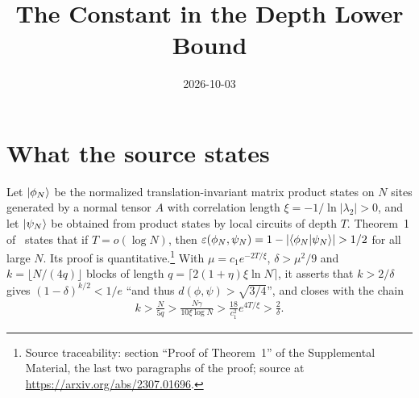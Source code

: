 \documentclass{article}
\title{The Constant in the Depth Lower Bound}
\author{}
\date{2026-10-03}
\begin{document}
\maketitle
{}

\section{What the source states}
Let $|\phi_N\rangle$ be the normalized translation-invariant matrix product
states on $N$ sites generated by a normal tensor $A$ with correlation length
$\xi=-1/\ln\lvert\lambda_2\rvert>0$, and let $|\psi_N\rangle$ be obtained from
product states by local circuits of depth $T$. Theorem~1
of~\cite{Malz2024Preparation} states that if $T=o(\log N)$, then
$\varepsilon(\phi_N,\psi_N)=1-\lvert\langle \phi_N | \psi_N \rangle\rvert>1/2$ for all
large $N$. Its proof is quantitative.\footnote{Source traceability: section
    ``Proof of Theorem~1'' of the Supplemental Material, the last two
    paragraphs of the proof; source at
    \url{https://arxiv.org/abs/2307.01696}.} With
$\mu=c_1e^{-2T/\xi}$, $\delta>\mu^2/9$ and $k=\lfloor N/(4q)\rfloor$ blocks of
length $q=\lceil2(1+\eta)\xi\ln N\rceil$, it asserts that $k>2/\delta$ gives
$(1-\delta)^{k/2}<1/e$ ``and thus $d(\phi,\psi)>\sqrt{3/4}$'', and closes with
the chain
\begin{align}
    k>\frac{N}{5q}>\frac{N\gamma}{10\xi\log N}>\frac{18}{c_1^2}e^{4T/\xi}
    >\frac2\delta .
    \label{eq:mswc24_depth_lower_bound_constant_chain}
\end{align}
\end{document}
